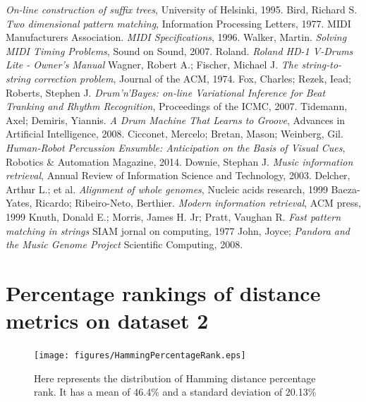 \documentclass[12pt,twoside,notitlepage]{report}
\begin{document}
\begin{thebibliography}{99}
	\emph{On-line construction of suffix trees},
	University of Helsinki,
	1995.
	Bird, Richard S.
	\emph{Two dimensional pattern matching},
	Information Processing Letters,
	1977.
	MIDI Manufacturers Association.
	\emph{MIDI Specifications},
	1996. 
	Walker, Martin.
	\emph{Solving MIDI Timing Problems},
	Sound on Sound,
	2007.
	Roland.
	\emph{Roland HD-1 V-Drums Lite - Owner's Manual}
	Wagner, Robert A.; Fischer, Michael J.
	\emph{The string-to-string correction problem},
	Journal of the ACM,
	1974.
	Fox, Charles; Rezek, Iead; Roberts, Stephen J.
	\emph{Drum'n'Bayes: on-line Variational Inference for Beat Tranking and Rhythm Recognition},
	Proceedings of the ICMC,
	2007.
	Tidemann, Axel; Demiris, Yiannis.
	\emph{A Drum Machine That Learns to Groove},
	Advances in Artificial Intelligence,
	2008.
	Cicconet, Mercelo; Bretan, Mason; Weinberg, Gil.
	\emph{Human-Robot Percussion Ensumble: Anticipation on the Basis of Visual Cues},
	Robotics \& Automation Magazine,
	2014.
	Downie, Stephan J.
	\emph{Music information retrieval},
	Annual Review of Information Science and Technology,
	2003.
	Delcher, Arthur L.; et al.
	\emph{Alignment of whole genomes},
	Nucleic acids research,
	1999
	Baeza-Yates, Ricardo; Ribeiro-Neto, Berthier.
	\emph{Modern information retrieval},
	ACM press,
	1999
	Knuth, Donald E.; Morris, James H. Jr; Pratt, Vaughan R.
	\emph{Fast pattern matching in strings}
	SIAM jornal on computing,
	1977 
	John, Joyce;
	\emph{Pandora and the Music Genome Project}
	Scientific Computing,
	2008.
	


\end{thebibliography}
\cleardoublepage

\appendix
\chapter{Percentage rankings of distance metrics on dataset 2}
	\begin{figure}[h]
			\centerline{\texttt{[image: figures/HammingPercentageRank.eps]}}
			\caption{\label{fig:Hamming Percentage Ranking} Here represents the distribution of Hamming distance percentage rank. It has a mean of 46.4\% and a standard deviation of 20.13\% }
\end{figure}
\end{document}
